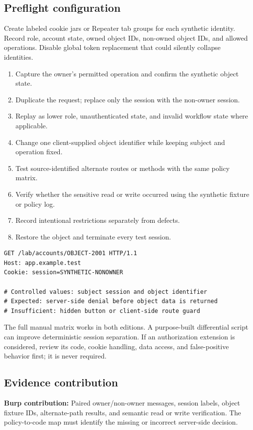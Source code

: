 \documentclass[11pt]{article}
\newcommand{\weekfield}[2]{%
  \Needspace{5\baselineskip}
  \subsection*{#1}
  #2
}
\newcommand{\burpevidence}[1]{\textbf{Burp contribution:} #1}
\begin{document}
\weekfield{Preflight configuration}{Create labeled cookie jars or Repeater tab
groups for each synthetic identity. Record role, account state, owned object IDs,
non-owned object IDs, and allowed operations. Disable global token replacement
that could silently collapse identities.}

\begin{procedurebox}
\begin{enumerate}
  \item Capture the owner's permitted operation and confirm the synthetic object state.
  \item Duplicate the request; replace only the session with the non-owner session.
  \item Replay as lower role, unauthenticated state, and invalid workflow state where applicable.
  \item Change one client-supplied object identifier while keeping subject and operation fixed.
  \item Test source-identified alternate routes or methods with the same policy matrix.
  \item Verify whether the sensitive read or write occurred using the synthetic fixture or policy log.
  \item Record intentional restrictions separately from defects.
  \item Restore the object and terminate every test session.
\end{enumerate}
\end{procedurebox}

\begin{lstlisting}[caption={Owner/non-owner authorization comparison}]
GET /lab/accounts/OBJECT-2001 HTTP/1.1
Host: app.example.test
Cookie: session=SYNTHETIC-NONOWNER

# Controlled values: subject session and object identifier
# Expected: server-side denial before object data is returned
# Insufficient: hidden button or client-side route guard
\end{lstlisting}

\begin{editionbox}
The full manual matrix works in both editions. A purpose-built differential
script can improve deterministic session separation. If an authorization
extension is considered, review its code, cookie handling, data access, and
false-positive behavior first; it is never required.
\end{editionbox}

\weekfield{Evidence contribution}{\burpevidence{Paired owner/non-owner messages,
session labels, object fixture IDs, alternate-path results, and semantic read or
write verification.} The policy-to-code map must identify the missing or incorrect
server-side decision.}
\end{document}
